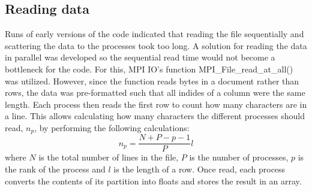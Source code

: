 
\subsection{Reading data}

Runs of early versions of the code indicated that reading the file sequentially and scattering the data to the processes took too long. A solution for reading the data in parallel was developed so the sequential read time would not become a bottleneck for the code. For this, MPI IO's function MPI\_File\_read\_at\_all() was utilized. However, since the function reads bytes in a document rather than rows, the data was pre-formatted such that all indides of a column were the same length. Each process then reads the first row to count how many characters are in a line. This allows calculating how many characters the different processes should read, $n_{p}$, by performing the following calculations:
\begin{equation}
    n_{p} =  \frac{N + P - p - 1}{P} l
\end{equation}
where $N$ is the total number of lines in the file, $P$ is the number of processes, $p$ is the rank of the process and $l$ is the length of a row. Once read, each process converts the contents of its partition into floats and stores the result in an array.
